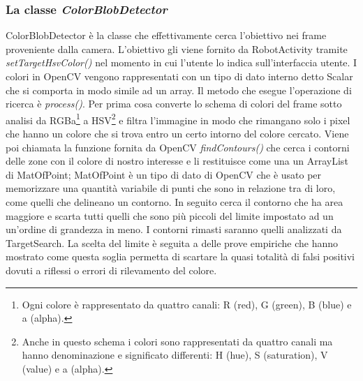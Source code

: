 \subsubsection{La classe \emph{ColorBlobDetector}}
ColorBlobDetector è la classe che effettivamente cerca l'obiettivo nei
frame proveniente dalla camera. L'obiettivo gli viene fornito da RobotActivity 
tramite \emph{setTargetHsvColor()} nel momento in cui l'utente lo indica 
sull'interfaccia utente. I colori in OpenCV vengono rappresentati con un tipo di dato interno
detto Scalar che si comporta in modo simile ad un array. Il metodo che esegue 
l'operazione di ricerca è \emph{process()}. Per prima cosa converte lo schema di 
colori del frame sotto analisi da RGBa\footnote{Ogni colore è rappresentato da 
quattro canali: R (red), G (green), B (blue) e a (alpha).} a HSV\footnote{Anche in questo
schema i colori sono rappresentati da quattro canali ma hanno denominazione e 
significato differenti: H (hue), S (saturation), V (value) e  a (alpha).} e filtra l'immagine in modo che rimangano solo 
i pixel che hanno un colore che si trova entro un certo intorno del colore cercato.
Viene poi chiamata la funzione fornita da OpenCV \emph{findContours()} che cerca i contorni delle
zone con il colore di nostro interesse e li restituisce come una un ArrayList di MatOfPoint;
MatOfPoint è un tipo di dato di OpenCV che è usato per memorizzare una quantità variabile
di punti che sono in relazione tra di loro, come quelli che delineano un contorno.
In seguito cerca il contorno che ha area maggiore e scarta tutti quelli che sono più piccoli 
del limite impostato ad un un'ordine di grandezza in meno. I contorni rimasti 
saranno quelli analizzati da TargetSearch. La scelta del limite è 
seguita a delle prove empiriche che hanno mostrato come questa soglia permetta di
scartare la quasi totalità di falsi positivi dovuti a riflessi o errori di 
rilevamento del colore. 


